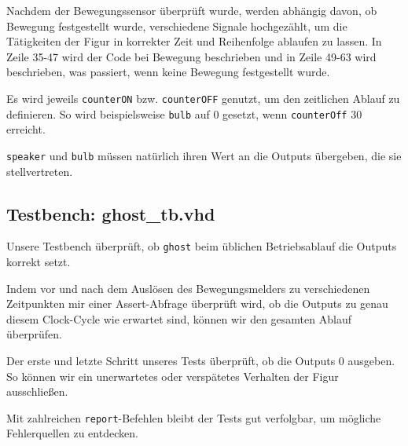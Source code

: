 \documentclass{pi3}
\begin{document}


Nachdem der Bewegungssensor überprüft wurde, werden abhängig davon, ob Bewegung festgestellt wurde, verschiedene Signale hochgezählt, um die Tätigkeiten der Figur in korrekter Zeit und Reihenfolge ablaufen zu lassen. In Zeile 35-47 wird der Code bei Bewegung beschrieben und in Zeile 49-63 wird beschrieben, was passiert, wenn keine Bewegung festgestellt wurde.

Es wird jeweils \texttt{counterON} bzw. \texttt{counterOFF} genutzt, um den zeitlichen Ablauf zu definieren. So wird beispielsweise \texttt{bulb} auf 0 gesetzt, wenn \texttt{counterOff} 30 erreicht.



\texttt{speaker} und \texttt{bulb} müssen natürlich ihren Wert an die Outputs übergeben, die sie stellvertreten.



\subsection*{Testbench: ghost\_tb.vhd}

Unsere Testbench überprüft, ob \texttt{ghost} beim üblichen Betriebsablauf die Outputs korrekt setzt. 
		
Indem vor und nach dem Auslösen des Bewegungsmelders zu verschiedenen Zeitpunkten mir einer Assert-Abfrage überprüft wird, ob die Outputs zu genau diesem Clock-Cycle wie erwartet sind, können wir den gesamten Ablauf überprüfen. 

Der erste und letzte Schritt unseres Tests überprüft, ob die Outputs 0 ausgeben. So können wir ein unerwartetes oder verspätetes Verhalten der Figur ausschließen.

Mit zahlreichen \texttt{report}-Befehlen bleibt der Tests gut verfolgbar, um mögliche Fehlerquellen zu entdecken.


\end{document}
